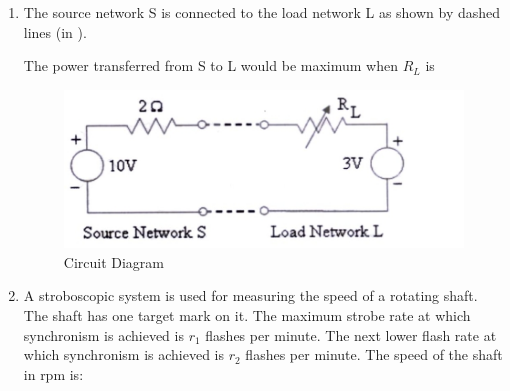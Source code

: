 \documentclass[journal,12pt,onecolumn]{IEEEtran}
\theoremstyle{remark}
\begin{document}
\begin{enumerate}
 
\item The source network S is connected to the load network L as shown by dashed lines (in ). \par
The power transferred from S to L would be maximum when $R_L$ is \par \hfill{}
\begin{figure}[H]
    \centering
    \includegraphics[width=0.5\columnwidth]{Figs/Q-28.jpg}
    \caption{Circuit Diagram}
    \label{fig:placeholder_6}
\end{figure}
\begin{enumerate}
\end{enumerate}
\item A stroboscopic system is used for measuring the speed of a rotating shaft. The shaft has one target mark on it. The maximum strobe rate at which synchronism is achieved is $r_1$ flashes per minute. The next lower flash rate at which synchronism is achieved is $r_2$ flashes per minute. The speed of the shaft in rpm is: \par \hfill{}
\begin{enumerate}
\end{enumerate}


\end{enumerate}
\end{document}
